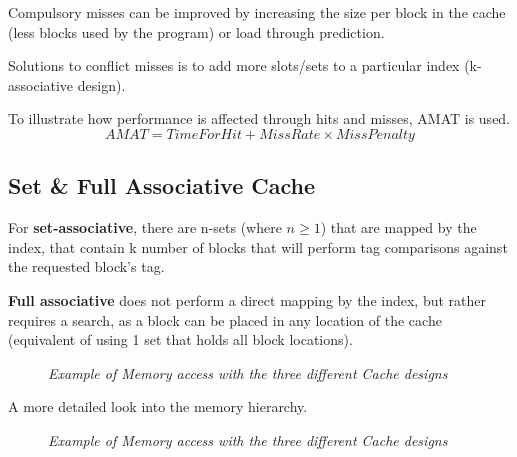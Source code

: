 \documentclass[11pt]{article}
\begin{document}
Compulsory misses can be improved by increasing the size per block in the cache (less blocks used by the program) or load through prediction.

Solutions to conflict misses is to add more slots/sets to a particular index (k-associative design).

To illustrate how performance is affected through hits and misses, AMAT is used.
\vspace{-1em}
$$AMAT = TimeForHit + MissRate \times MissPenalty$$

\subsection*{Set \& Full Associative Cache}

For \textbf{set-associative}, there are n-sets (where $n\ge 1$) that are mapped by the index, that contain k number of blocks that will perform tag comparisons against the requested block's tag.

\textbf{Full associative} does not perform a direct mapping by the index, but rather requires a search, as a block can be placed in any location of the cache (equivalent of using 1 set that holds all block locations).

\begin{figure}[htbp]
    \centering
    \caption{\textit{Example of Memory access with the three different Cache designs}}
\end{figure}

A more detailed look into the memory hierarchy.

\pagebreak
\begin{figure}[htbp]
    \centering
    \caption{\textit{Example of Memory access with the three different Cache designs}}
\end{figure}
\end{document}
